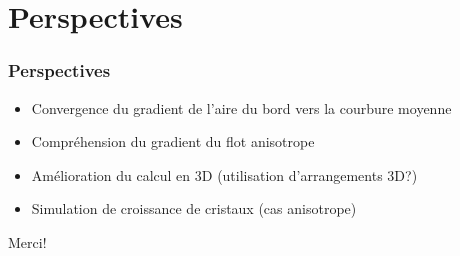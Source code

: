 \documentclass{beamer}
\begin{document}
\section{Perspectives}

\begin{frame}
    \frametitle{Perspectives}

    \begin{itemize}
        \item Convergence du gradient de l'aire du bord vers la courbure
            moyenne
        \item Compréhension du gradient du flot anisotrope
        \item Amélioration du calcul en 3D (utilisation d'arrangements 3D?)
        \item Simulation de croissance de cristaux (cas anisotrope)
    \end{itemize}
\end{frame}

\begin{frame}
    \begin{center}
        \huge{Merci!}
    \end{center}
\end{frame}
\end{document}
